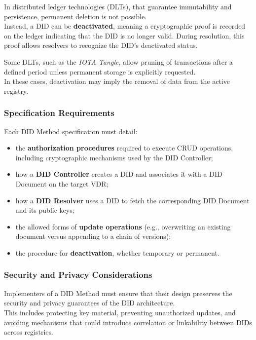 \noindent
In distributed ledger technologies (DLTs), that guarantee immutability and persistence, permanent deletion is not possible.\\  
Instead, a DID can be \textbf{deactivated}, meaning a cryptographic proof is recorded on the ledger indicating that the DID is no longer valid.  
During resolution, this proof allows resolvers to recognize the DID’s deactivated status.

\medskip

\noindent
Some DLTs, such as the \textit{IOTA Tangle}, allow pruning of transactions after a defined period unless permanent storage is explicitly requested.\\ 
In these cases, deactivation may imply the removal of data from the active registry.

\subsubsection *{Specification Requirements}
Each DID Method specification must detail:
\begin{itemize}
    \item the \textbf{authorization procedures} required to execute CRUD operations, including cryptographic mechanisms used by the DID Controller;
    \item how a \textbf{DID Controller} creates a DID and associates it with a DID Document on the target VDR;
    \item how a \textbf{DID Resolver} uses a DID to fetch the corresponding DID Document and its public keys;
    \item the allowed forms of \textbf{update operations} (e.g., overwriting an existing document versus appending to a chain of versions);
    \item the procedure for \textbf{deactivation}, whether temporary or permanent.
\end{itemize}

\subsubsection *{Security and Privacy Considerations}
Implementers of a DID Method must ensure that their design preserves the security and privacy guarantees of the DID architecture.\\  
This includes protecting key material, preventing unauthorized updates, and avoiding mechanisms that could introduce correlation or linkability between DIDs across registries.

